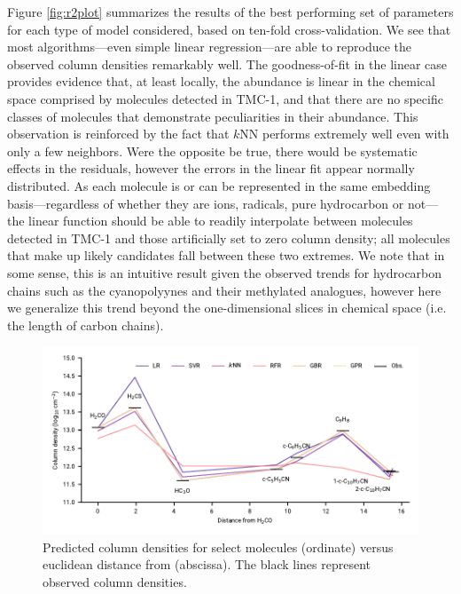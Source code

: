 \documentclass[twocolumn]{aastex63}
\begin{document}
Figure \ref{fig:r2plot} summarizes the results of the best performing set of parameters for each type of model considered, based on ten-fold cross-validation. We see that most algorithms---even simple linear regression---are able to reproduce the observed column densities remarkably well. The goodness-of-fit in the linear case provides evidence that, at least locally, the abundance is linear in the chemical space comprised by molecules detected in TMC-1, and that there are no specific classes of molecules that demonstrate peculiarities in their abundance. This observation is reinforced by the fact that $k$NN performs extremely well even with only a few neighbors. Were the opposite be true, there would be systematic effects in the residuals, however the errors in the linear fit appear normally distributed. As each molecule is or can be represented in the same embedding basis---regardless of whether they are ions, radicals, pure hydrocarbon or not---the linear function should be able to readily interpolate between molecules detected in TMC-1 and those artificially set to zero column density; all molecules that make up likely candidates fall between these two extremes. We note that in some sense, this is an intuitive result given the observed trends for hydrocarbon chains such as the cyanopolyynes and their methylated analogues, however here we generalize this trend beyond the one-dimensional slices in chemical space (i.e. the length of carbon chains).

\begin{figure}
    \centering
    \includegraphics[width=\textwidth]{demoset.pdf}
    \caption{Predicted column densities for select molecules (ordinate) versus euclidean distance from  (abscissa). The black lines represent observed column densities.}
    \label{fig:demoset}
\end{figure}
\end{document}
